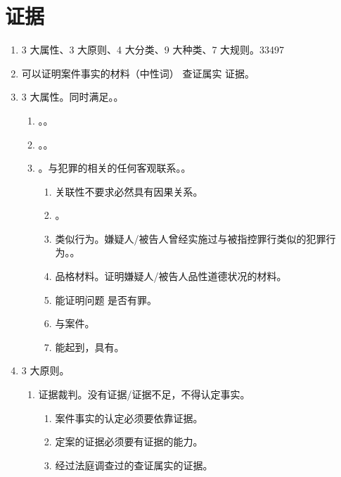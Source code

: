 \section{证据}
\begin{enumerate}
  \item 3 大属性、3 大原则、4 大分类、9 大种类、7 大规则。33497
  \item 可以证明案件事实的材料（中性词） \yjt 查证属实 \yjt 证据。
  \item 3 大属性。同时满足。。
        \begin{enumerate}
          \item {}。。
          \item {}。。
          \item {}。与犯罪的相关的任何客观联系。。
                \begin{enumerate}
                  \item 关联性不要求必然具有因果关系。
                  \item {}。
                  \item 类似行为。嫌疑人/被告人曾经实施过与被指控罪行类似的犯罪行为。。
                  \item 品格材料。证明嫌疑人/被告人品性道德状况的材料。
                  \item 能证明问题 \yjt 是否有罪。
                  \item 与案件。
                  \item 能起到，具有。
                \end{enumerate}
        \end{enumerate}
  \item 3 大原则。
        \begin{enumerate}
          \item 证据裁判。没有证据/证据不足，不得认定事实。
                \begin{enumerate}
                  \item 案件事实的认定必须要依靠证据。
                  \item 定案的证据必须要有证据的能力。
                  \item 经过法庭调查过的查证属实的证据。

\end{enumerate}
\end{enumerate}
\end{enumerate}
